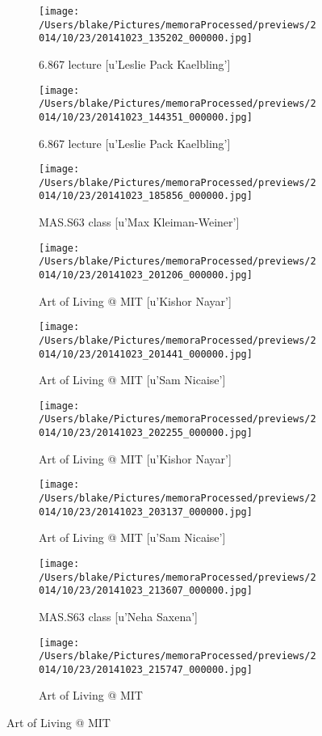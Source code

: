 \documentclass{article}
\begin{document}
\begin{figure}
\begin{subfigure}{.25\textwidth}\centering\texttt{[image: /Users/blake/Pictures/memoraProcessed/previews/2014/10/23/20141023\_135202\_000000.jpg]}\caption{6.867 lecture
[u'Leslie Pack Kaelbling']}\end{subfigure}
\begin{subfigure}{.25\textwidth}\centering\texttt{[image: /Users/blake/Pictures/memoraProcessed/previews/2014/10/23/20141023\_144351\_000000.jpg]}\caption{6.867 lecture
[u'Leslie Pack Kaelbling']}\end{subfigure}
\begin{subfigure}{.25\textwidth}\centering\texttt{[image: /Users/blake/Pictures/memoraProcessed/previews/2014/10/23/20141023\_185856\_000000.jpg]}\caption{MAS.S63 class
[u'Max Kleiman-Weiner']}\end{subfigure}
\begin{subfigure}{.25\textwidth}\centering\texttt{[image: /Users/blake/Pictures/memoraProcessed/previews/2014/10/23/20141023\_201206\_000000.jpg]}\caption{Art of Living @ MIT
[u'Kishor Nayar']}\end{subfigure}
\begin{subfigure}{.25\textwidth}\centering\texttt{[image: /Users/blake/Pictures/memoraProcessed/previews/2014/10/23/20141023\_201441\_000000.jpg]}\caption{Art of Living @ MIT
[u'Sam Nicaise']}\end{subfigure}
\begin{subfigure}{.25\textwidth}\centering\texttt{[image: /Users/blake/Pictures/memoraProcessed/previews/2014/10/23/20141023\_202255\_000000.jpg]}\caption{Art of Living @ MIT
[u'Kishor Nayar']}\end{subfigure}
\begin{subfigure}{.25\textwidth}\centering\texttt{[image: /Users/blake/Pictures/memoraProcessed/previews/2014/10/23/20141023\_203137\_000000.jpg]}\caption{Art of Living @ MIT
[u'Sam Nicaise']}\end{subfigure}
\begin{subfigure}{.25\textwidth}\centering\texttt{[image: /Users/blake/Pictures/memoraProcessed/previews/2014/10/23/20141023\_213607\_000000.jpg]}\caption{MAS.S63 class
[u'Neha Saxena']}\end{subfigure}
\begin{subfigure}{.25\textwidth}\centering\texttt{[image: /Users/blake/Pictures/memoraProcessed/previews/2014/10/23/20141023\_215747\_000000.jpg]}\caption{Art of Living @ MIT
}
\end{subfigure}
\end{figure}
\end{document}
